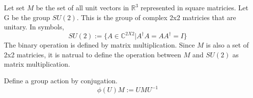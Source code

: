 \documentclass{article}
\newcommand{\RR}{\mathbb{R}}
\newcommand{\CC}{\mathbb{C}}
\begin{document}
Let set $M$ be the set of all  
unit vectors in $\RR^3$ represented in square matricies. 
Let G be the group $SU(2)$. This
is the group of complex 2x2 matricies that are unitary. In symbols, 
\[
    SU(2) := \{A \in \CC^{2X2}|A^\dagger A =AA^\dagger= I\}
\]
The binary operation is defined by matrix multiplication. 
Since $M$ is also a set of 2x2 matricies, it is natrual 
to define the operation between $M$ and 
$SU(2)$ as matrix multiplication. 

Define a group action by conjugation. 
\[
    \phi(U) M := U M U^{-1} 
\]



\end{document}
